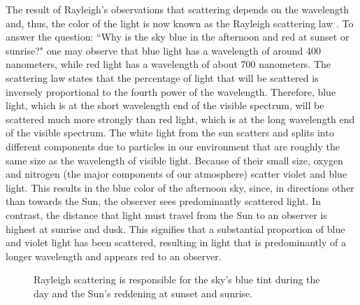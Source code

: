 The result of Rayleigh's observations that scattering depends on the wavelength and, thus, the color of the light is  now known as the Rayleigh scattering law \cite{rayleigh1871scattering,lord1871light}. To answer the question: ``Why is the sky blue in the afternoon and red at sunset or sunrise?" one may observe that blue light has a wavelength of around 400 nanometers, while red light has a wavelength of about 700 nanometers. The scattering law states that the percentage of light that will be scattered is inversely proportional to the fourth power of the wavelength. Therefore, blue light, which is at the short wavelength end of the visible spectrum, will be scattered much more strongly than red light, which is at the long wavelength end of the visible spectrum. The white light from the sun scatters and splits into different components due to particles in our environment that are roughly the same size as the wavelength of visible light.
Because of their small size, oxygen and nitrogen (the major components of our atmosphere) scatter violet and blue light.  This results in the blue color of the afternoon sky, since, in directions other than towards the Sun, the observer sees predominantly scattered light. In contrast, the distance that light must travel from the Sun to an observer is highest at sunrise and dusk. This signifies that a substantial proportion of blue and violet light has been scattered, resulting in light that is predominantly of a longer wavelength and appears red to an observer. 
\vspace{-17mm}
\begin{figure}[H]
\centering
\vspace{3mm}
\caption{Rayleigh scattering is responsible for the sky's blue tint during the day and the Sun's reddening at sunset and sunrise.}
\end{figure}
